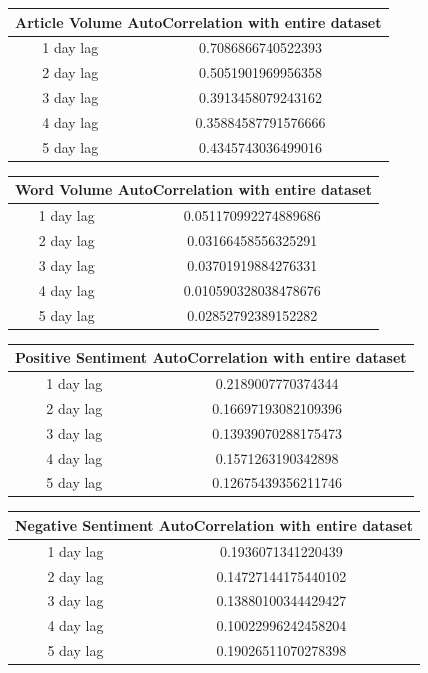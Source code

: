 \begin{center}
\begin{tabular}{ c c }
\hline
\multicolumn{2}{|c|}{Article Volume AutoCorrelation with entire dataset} \\
\hline
1 day lag & 0.7086866740522393 \\
2 day lag & 0.5051901969956358 \\
3 day lag & 0.3913458079243162 \\
4 day lag & 0.35884587791576666 \\
5 day lag & 0.4345743036499016
\end{tabular}
\end{center}

\begin{center}
\begin{tabular}{ c c }
\hline
\multicolumn{2}{|c|}{Word Volume AutoCorrelation with entire dataset} \\
\hline
1 day lag & 0.051170992274889686 \\
2 day lag & 0.03166458556325291 \\
3 day lag & 0.03701919884276331 \\
4 day lag & 0.010590328038478676 \\
5 day lag & 0.02852792389152282
\end{tabular}
\end{center}

\begin{center}
\begin{tabular}{ c c }
\hline
\multicolumn{2}{|c|}{Positive Sentiment AutoCorrelation with entire dataset} \\
\hline
1 day lag & 0.2189007770374344 \\
2 day lag & 0.16697193082109396 \\
3 day lag & 0.13939070288175473 \\
4 day lag & 0.1571263190342898 \\
5 day lag & 0.12675439356211746
\end{tabular}
\end{center}

\begin{center}
\begin{tabular}{ c c }
\hline
\multicolumn{2}{|c|}{Negative Sentiment AutoCorrelation with entire dataset} \\
\hline
1 day lag & 0.1936071341220439 \\
2 day lag & 0.14727144175440102 \\
3 day lag & 0.13880100344429427 \\
4 day lag & 0.10022996242458204 \\
5 day lag & 0.19026511070278398
\end{tabular}
\end{center}


